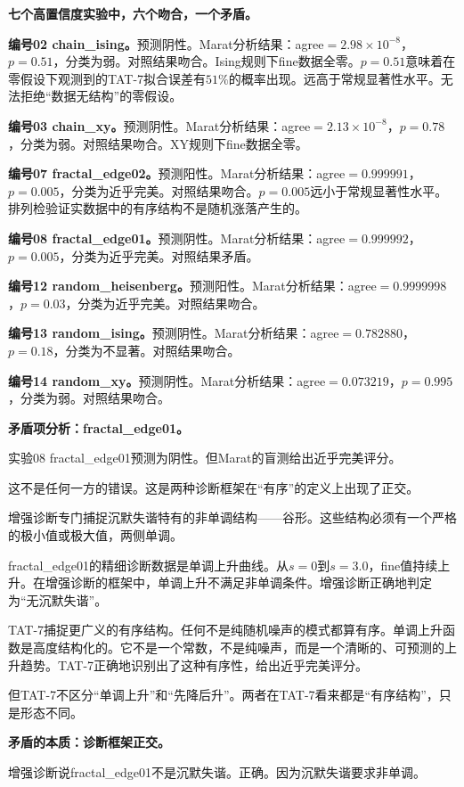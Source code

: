 \documentclass[11pt,a4paper]{book}
\theoremstyle{definition}
\begin{document}
\textbf{七个高置信度实验中，六个吻合，一个矛盾。}

\textbf{编号02 chain\_ising。}预测阴性。Marat分析结果：agree$=2.98\times10^{-8}$，$p=0.51$，分类为弱。对照结果吻合。Ising规则下fine数据全零。$p=0.51$意味着在零假设下观测到的TAT-7拟合误差有$51\%$的概率出现。远高于常规显著性水平。无法拒绝“数据无结构”的零假设。

\textbf{编号03 chain\_xy。}预测阴性。Marat分析结果：agree$=2.13\times10^{-8}$，$p=0.78$，分类为弱。对照结果吻合。XY规则下fine数据全零。

\textbf{编号07 fractal\_edge02。}预测阳性。Marat分析结果：agree$=0.999991$，$p=0.005$，分类为近乎完美。对照结果吻合。$p=0.005$远小于常规显著性水平。排列检验证实数据中的有序结构不是随机涨落产生的。

\textbf{编号08 fractal\_edge01。}预测阴性。Marat分析结果：agree$=0.999992$，$p=0.005$，分类为近乎完美。对照结果矛盾。

\textbf{编号12 random\_heisenberg。}预测阳性。Marat分析结果：agree$=0.9999998$，$p=0.03$，分类为近乎完美。对照结果吻合。

\textbf{编号13 random\_ising。}预测阴性。Marat分析结果：agree$=0.782880$，$p=0.18$，分类为不显著。对照结果吻合。

\textbf{编号14 random\_xy。}预测阴性。Marat分析结果：agree$=0.073219$，$p=0.995$，分类为弱。对照结果吻合。

\textbf{矛盾项分析：fractal\_edge01。}

实验08 fractal\_edge01预测为阴性。但Marat的盲测给出近乎完美评分。

这不是任何一方的错误。这是两种诊断框架在“有序”的定义上出现了正交。

增强诊断专门捕捉沉默失谐特有的非单调结构——谷形。这些结构必须有一个严格的极小值或极大值，两侧单调。

fractal\_edge01的精细诊断数据是单调上升曲线。从$s=0$到$s=3.0$，fine值持续上升。在增强诊断的框架中，单调上升不满足非单调条件。增强诊断正确地判定为“无沉默失谐”。

TAT-7捕捉更广义的有序结构。任何不是纯随机噪声的模式都算有序。单调上升函数是高度结构化的。它不是一个常数，不是纯噪声，而是一个清晰的、可预测的上升趋势。TAT-7正确地识别出了这种有序性，给出近乎完美评分。

但TAT-7不区分“单调上升”和“先降后升”。两者在TAT-7看来都是“有序结构”，只是形态不同。

\textbf{矛盾的本质：诊断框架正交。}

增强诊断说fractal\_edge01不是沉默失谐。正确。因为沉默失谐要求非单调。
\end{document}
